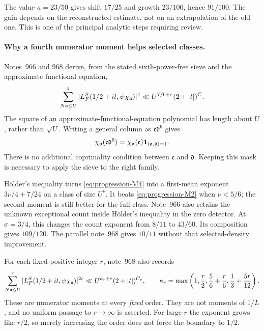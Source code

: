 The value $a=23/50$ gives shift $17/25$ and growth $23/100$, hence $91/100$. The gain depends on the reconstructed estimate, not on an extrapolation of the old one. This is one of the principal analytic steps requiring review.

\paragraph{Why a fourth numerator moment helps selected classes.}
Notes~966 and 968 \cite{R966,R968} derive, from the stated sixth-power-free sieve and the approximate functional equation,
\begin{equation}\label{eq:progression-M4}
 \sum_{N\mathfrak a\le U}^{\flat}|L_F^S(1/2+it,\psi\chi_{\mathfrak a})|^4
       \ll U^{7/6+\varepsilon}(2+|t|)^C.
\end{equation}
The square of an approximate-functional-equation polynomial has length about $U$, rather than $\sqrt U$. Writing a general column as $\mathfrak c\mathfrak d^6$ gives
\[
 \chi_{\mathfrak a}(\mathfrak c\mathfrak d^6)
 =\chi_{\mathfrak a}(\mathfrak c)\mathbf 1_{(\mathfrak a,\mathfrak d)=1}.
\]
There is no additional coprimality condition between $\mathfrak c$ and $\mathfrak d$. Keeping this mask is necessary to apply the sieve to the right family.

H\"older's inequality turns \eqref{eq:progression-M4} into a first-mean exponent $3\nu/4+7/24$ on a class of size $U^\nu$. It beats \eqref{eq:progression-M2} when $\nu<5/6$; the second moment is still better for the full class. Note~966 also retains the unknown exceptional count inside H\"older's inequality in the zero detector. At $\sigma=3/4$, this changes the count exponent from $8/11$ to $43/60$. Its composition gives $109/120$. The parallel note~968 gives $10/11$ without that selected-density improvement.

For each fixed positive integer $r$, note~968 also records
\begin{equation}\label{eq:all-numerator-orders}
 \sum_{N\mathfrak a\le U}^{\flat}|L_F^S(1/2+it,\psi\chi_{\mathfrak a})|^{2r}
       \ll U^{\kappa_r+\varepsilon}(2+|t|)^{C_r},\qquad
 \kappa_r=\max\left(1,\frac r2,\frac56+\frac r6,
                              \frac13+\frac{5r}{12}\right).
\end{equation}
These are numerator moments at every \emph{fixed} order. They are not moments of $1/L$, and no uniform passage to $r\to\infty$ is asserted. For large $r$ the exponent grows like $r/2$, so merely increasing the order does not force the boundary to $1/2$.

